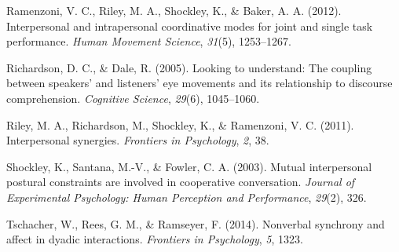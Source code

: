 \documentclass[10pt, letterpaper]{article}
\begin{document}
\hypertarget{ref-ramenzoni2012interpersonal}{}
Ramenzoni, V. C., Riley, M. A., Shockley, K., \& Baker, A. A. (2012).
Interpersonal and intrapersonal coordinative modes for joint and single
task performance. \emph{Human Movement Science}, \emph{31}(5),
1253--1267.

\hypertarget{ref-richardson2005looking}{}
Richardson, D. C., \& Dale, R. (2005). Looking to understand: The
coupling between speakers' and listeners' eye movements and its
relationship to discourse comprehension. \emph{Cognitive Science},
\emph{29}(6), 1045--1060.

\hypertarget{ref-riley2011interpersonal}{}
Riley, M. A., Richardson, M., Shockley, K., \& Ramenzoni, V. C. (2011).
Interpersonal synergies. \emph{Frontiers in Psychology}, \emph{2}, 38.

\hypertarget{ref-shockley2003mutual}{}
Shockley, K., Santana, M.-V., \& Fowler, C. A. (2003). Mutual
interpersonal postural constraints are involved in cooperative
conversation. \emph{Journal of Experimental Psychology: Human Perception
and Performance}, \emph{29}(2), 326.

\hypertarget{ref-tschacher2014nonverbal}{}
Tschacher, W., Rees, G. M., \& Ramseyer, F. (2014). Nonverbal synchrony
and affect in dyadic interactions. \emph{Frontiers in Psychology},
\emph{5}, 1323.
\end{document}
